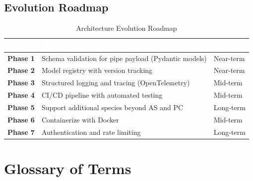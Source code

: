 \documentclass[11pt,a4paper,oneside]{report}
\begin{document}
\section{Evolution Roadmap}

\begin{table}[H]
\centering\footnotesize
\caption{Architecture Evolution Roadmap}
\label{tab:evolution}
\begin{tabularx}{\textwidth}{>{\bfseries}l X l}
\toprule
\rowcolor{tableheader}
\textcolor{white}{Phase} & \textcolor{white}{Description} & \textcolor{white}{Timeline} \\
\midrule
Phase 1 & Schema validation for pipe payload (Pydantic models) & Near-term \\
Phase 2 & Model registry with version tracking & Near-term \\
Phase 3 & Structured logging and tracing (OpenTelemetry) & Mid-term \\
Phase 4 & CI/CD pipeline with automated testing & Mid-term \\
Phase 5 & Support additional species beyond AS and PC & Long-term \\
Phase 6 & Containerize with Docker & Mid-term \\
Phase 7 & Authentication and rate limiting & Long-term \\
\bottomrule
\end{tabularx}
\end{table}


\chapter{Glossary of Terms}
\end{document}
